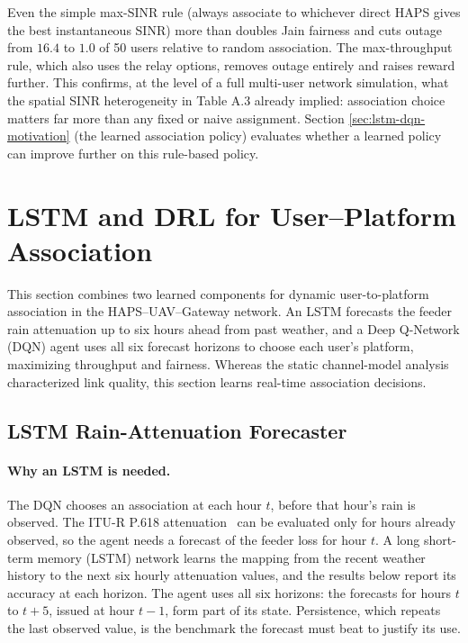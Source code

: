 \documentclass[conference]{IEEEtran}
\begin{document}
Even the simple max-SINR rule (always associate to whichever direct HAPS gives the best instantaneous SINR) more than doubles Jain fairness and cuts outage from $16.4$ to $1.0$ of 50 users relative to random association. The max-throughput rule, which also uses the relay options, removes outage entirely and raises reward further. This confirms, at the level of a full multi-user network simulation, what the spatial SINR heterogeneity in Table A.3 already implied: association choice matters far more than any fixed or naive assignment. Section
\ref{sec:lstm-dqn-motivation} (the learned association policy) evaluates whether a learned policy can improve
further on this rule-based policy.

\section{LSTM and DRL for User--Platform Association}

This section combines two learned components for dynamic user-to-platform association in the HAPS--UAV--Gateway network. An LSTM forecasts the feeder rain attenuation up to six hours ahead from past weather, and a Deep Q-Network (DQN) agent uses all six forecast horizons to choose each user's platform, maximizing throughput and fairness. Whereas the static channel-model analysis characterized link quality, this section learns real-time association decisions.

\subsection{LSTM Rain-Attenuation Forecaster}
\label{sec:lstm}

\paragraph{Why an LSTM is needed.} The DQN chooses an association at each hour $t$, before that hour's rain is observed. The ITU-R P.618 attenuation~\cite{itu_p618} can be evaluated only for hours already observed, so the agent needs a forecast of the feeder loss for hour $t$. A long short-term memory (LSTM) network learns the mapping from the recent weather history to the next six hourly attenuation values, and the results below report its accuracy at each horizon. The agent uses all six horizons: the forecasts for hours $t$ to $t{+}5$, issued at hour $t{-}1$, form part of its state. Persistence, which repeats the last observed value, is the benchmark the forecast must beat to justify its use.
\end{document}
